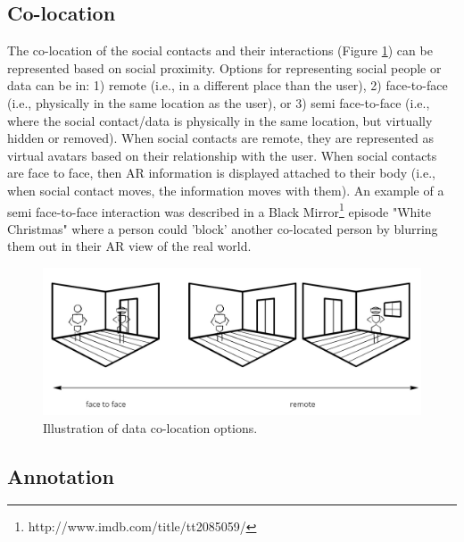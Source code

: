\subsection{Co-location}


The co-location of the social contacts and their interactions (Figure \ref{fig:continuum:data-colocation}) can be represented based on social proximity. Options for representing social people or data can be in: 
1) remote (i.e., in a different place than the user), 
2) face-to-face (i.e., physically in the same location as the user), or 
3) semi face-to-face (i.e., where the social contact/data is physically in the same location, but virtually hidden or removed). When social contacts are remote, they are represented as virtual avatars based on their relationship with the user. When social contacts are face to face, then AR information is displayed attached to their body (i.e., when social contact moves, the information moves with them). 
An example of a semi face-to-face interaction was described in a Black Mirror\footnote{http://www.imdb.com/title/tt2085059/} episode "White Christmas" where a person could 'block' another co-located person by blurring them out in their AR view of the real world.

\begin{figure}[ht]
    \centering
    \includegraphics[width=0.8\linewidth]{images/30-continuum/continuum-colocation.jpg}
    \caption{Illustration of data co-location options.}
    \label{fig:continuum:data-colocation}
\end{figure}


\subsection{Annotation}

